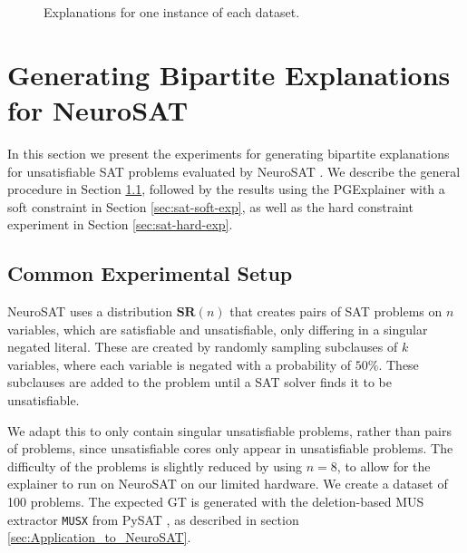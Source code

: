 \begin{figure}[h]
    \caption{Explanations for one instance of each dataset.}
    \label{fig:qual_expl}
\end{figure}





\section{Generating Bipartite Explanations for NeuroSAT}
\label{sec:SAT-experiments}

In this section we present the experiments for generating bipartite explanations for unsatisfiable SAT problems evaluated by NeuroSAT \cite{selsam2018learning}. We describe the general procedure in Section \ref{sec:SAT-exp-setup}, followed by the results using the PGExplainer with a soft constraint in Section \ref{sec:sat-soft-exp}, as well as the hard constraint experiment in Section \ref{sec:sat-hard-exp}.

\subsection{Common Experimental Setup}
\label{sec:SAT-exp-setup}

NeuroSAT \cite{selsam2018learning} uses a distribution $\textbf{SR}(n)$ that creates pairs of SAT problems on $n$ variables, which are satisfiable and unsatisfiable, only differing in a singular negated literal. These are created by randomly sampling subclauses of $k$ variables, where each variable is negated with a probability of $50\%$. These subclauses are added to the problem until a SAT solver \cite{een2003extensible} finds it to be unsatisfiable. 

We adapt this to only contain singular unsatisfiable problems, rather than pairs of problems, since unsatisfiable cores only appear in unsatisfiable problems. The difficulty of the problems is slightly reduced by using $n=8$, to allow for the explainer to run on NeuroSAT on our limited hardware. We create a dataset of 100 problems. The expected \ac{GT} is generated with the deletion-based MUS extractor \lstinline|MUSX| from PySAT \cite{imms-sat18}, as described in section \ref{sec:Application_to_NeuroSAT}. \bigskip

